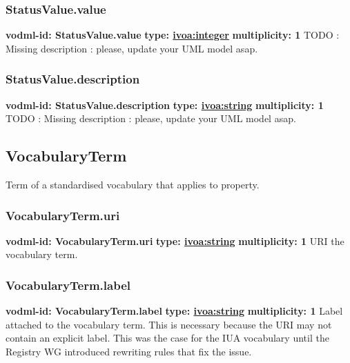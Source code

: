    \subsubsection{StatusValue.value}
      \textbf{vodml-id: StatusValue.value} \newline
      \textbf{type: \hyperref[sect:ivoa]{ivoa:integer}} \newline
      \textbf{multiplicity: 1} \newline 
      TODO : Missing description : please, update your UML model asap.

    \subsubsection{StatusValue.description}
      \textbf{vodml-id: StatusValue.description} \newline
      \textbf{type: \hyperref[sect:ivoa]{ivoa:string}} \newline
      \textbf{multiplicity: 1} \newline 
      TODO : Missing description : please, update your UML model asap.

  \subsection{VocabularyTerm}
  \label{sect:VocabularyTerm}
    Term of a standardised vocabulary that applies to property.

    \subsubsection{VocabularyTerm.uri}
      \textbf{vodml-id: VocabularyTerm.uri} \newline
      \textbf{type: \hyperref[sect:ivoa]{ivoa:string}} \newline
      \textbf{multiplicity: 1} \newline 
      URI the vocabulary term.

    \subsubsection{VocabularyTerm.label}
      \textbf{vodml-id: VocabularyTerm.label} \newline
      \textbf{type: \hyperref[sect:ivoa]{ivoa:string}} \newline
      \textbf{multiplicity: 1} \newline 
      Label attached to the vocabulary term. This is necessary because the URI may not contain an explicit label. This was the case for the IUA vocabulary until the Registry WG introduced rewriting rules that fix the issue.

